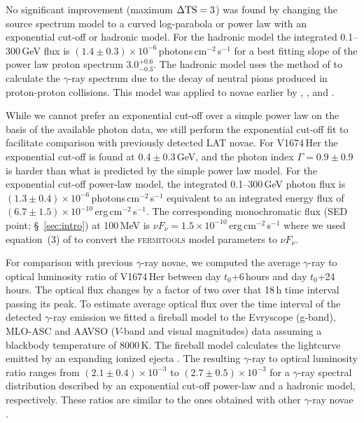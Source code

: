 \documentclass[a4paper,fleqn,usenatbib]{mnras}
\newcommand{\nova}{V1674\,Her}
\begin{document}
No significant improvement (maximum $\Delta {\rm TS}=3$) was found by changing the source spectrum model 
to a curved log-parabola or power law with an exponential cut-off or hadronic model. 
For the hadronic model the integrated 0.1--300\,GeV flux is $(1.4 \pm 0.3) \times 10^{-6}$\,photons\,cm$^{-2}$\,s$^{-1}$ 
for a best fitting slope of the power law proton spectrum $3.0^{+0.6}_{-0.3}$. 
The hadronic model uses the method of \cite{2006ApJ...647..692K} to calculate the $\gamma$-ray spectrum 
due to the decay of neutral pions produced in proton-proton collisions. 
This model was applied to novae earlier by \cite{2010Sci...329..817A}, \cite{2014Sci...345..554A},
and \cite{2022ApJ...935...44C}.

While we cannot prefer an exponential cut-off over a simple power law on
the basis of the available photon data, we still perform the exponential cut-off
fit to facilitate comparison with previously detected LAT novae. 
For \nova{} the exponential cut-off is
found at $0.4 \pm 0.3$\,GeV, and the photon index $\Gamma = 0.9 \pm 0.9$ is
harder than what is predicted by the simple power law model.
For the exponential cut-off power-law model, the integrated 0.1--300\,GeV photon flux is 
$(1.3 \pm 0.4) \times 10^{-6}$\,photons\,cm$^{-2}$\,s$^{-1}$ equivalent to an
integrated energy flux of 
$(6.7 \pm 1.5) \times 10^{-10}$\,erg\,cm$^{-2}$\,s$^{-1}$.
The corresponding monochromatic flux 
(SED point; \S~\ref{sec:intro}) 
at 100\,MeV is 
$\nu F_\nu = 1.5 \times 10^{-10}$\,erg\,cm$^{-2}$\,s$^{-1}$ where we used 
equation~(3) of \cite{2022MNRAS.514.2239S} to convert the \textsc{fermitools}
model parameters to $\nu F_\nu$.

For comparison with previous $\gamma$-ray novae, we computed the average $\gamma$-ray to optical luminosity ratio of 
\nova{} between day $t_0$+6\,hours and day $t_0$+24\,hours. The optical 
flux changes by a factor of two over that 18\,h time interval passing its peak. 
To estimate average optical flux over the time interval of the detected $\gamma$-ray emission 
we fitted a fireball model to the Evryscope (g-band), MLO-ASC and AAVSO ($V$-band and visual magnitudes) data assuming a blackbody temperature of
8000\,K. The fireball model calculates the lightcurve emitted by an expanding ionized ejecta \citep[e.g. see section 5 of][and references therein]{2017MNRAS.469.4341M}.
The resulting $\gamma$-ray to optical luminosity ratio ranges from 
$(2.1 \pm 0.4) \times 10^{-3}$ to $(2.7 \pm 0.5) \times 10^{-3}$ 
for a $\gamma$-ray spectral distribution described by an exponential cut-off power-law and a hadronic model, respectively. 
These ratios are similar to the ones obtained with other $\gamma$-ray novae 
\citep{2015MNRAS.450.2739M,2017NatAs...1..697L,2020NatAs...4..776A,2022ApJ...935...44C}. 
\end{document}
